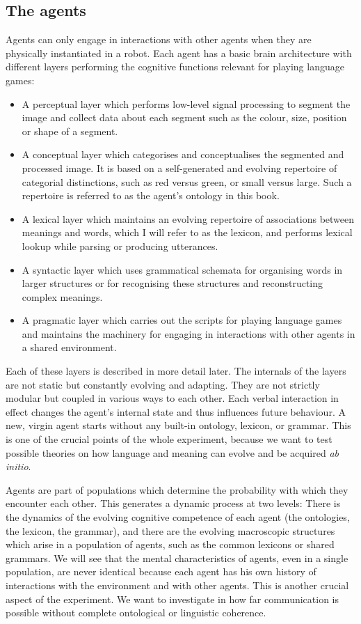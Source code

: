 \subsection{The agents}

Agents can only engage in interactions with other agents 
when they are physically instantiated
in a robot. Each agent has a basic brain architecture
with different layers performing the cognitive functions 
relevant for playing language games: 
\begin{itemize}
\item A perceptual layer which performs low-level signal 
processing to segment the image and collect data about 
each segment such as the colour, size, position or shape
of a segment. 
\item A conceptual layer which categorises and 
conceptualises the segmented and processed image. 
It is based on a self-generated and evolving repertoire
of categorial distinctions, such as red versus green, or
small versus large. Such a repertoire is referred to as 
the agent's ontology in this book. 
\item A lexical layer which maintains an evolving repertoire
of associations between meanings and words, which I will refer to 
as the lexicon, and performs lexical lookup while parsing 
or producing utterances. 
\item A syntactic layer which uses 
grammatical schemata for organising words
in larger structures or for recognising these structures and
reconstructing complex meanings. 
\item A pragmatic layer which carries out the
scripts for playing language games and maintains the machinery 
for engaging in interactions with other agents in a 
shared environment. 
\end{itemize}
Each of these layers is described in more detail 
later. The internals of the layers are not static but
constantly evolving and adapting. They are not strictly 
modular but coupled in various ways to each other.
Each verbal interaction 
in effect changes the agent's internal state and thus 
influences future behaviour. A new, virgin agent 
starts without any built-in ontology, lexicon, or grammar. 
This is one of the crucial points of the whole experiment, 
because we want to test possible theories on how language
and meaning can evolve and be acquired {\itshape ab initio}. 

Agents are part of populations which determine the probability
with which they encounter each other. This generates 
a dynamic process at two levels: There is the dynamics of the evolving
cognitive competence of each agent (the ontologies, 
the lexicon, the grammar), and there are 
the evolving macroscopic structures which arise in a population
of agents, such as the common lexicons or shared grammars. 
We will see that the mental 
characteristics of agents, even in a single population, are never 
identical because each agent has his own history of 
interactions with the environment and with other agents. 
This is another crucial aspect of the experiment. 
We want to investigate in how far communication is possible
without complete ontological or linguistic coherence. 

